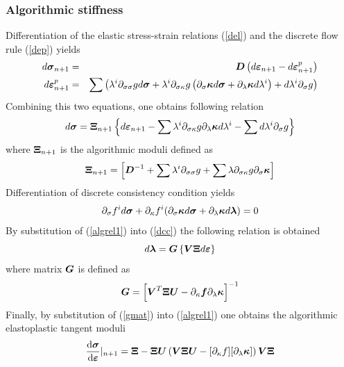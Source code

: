 \documentclass[epsf,a4paper]{article}
\newcommand{\mbf}[1]{\mbox{\boldmath$#1$}}
\newcommand{\del}[2]{\mbox{$\displaystyle\frac{#1}{#2}$}}
\newcommand{\ep}[0]{\mbf{\varepsilon}^p}
\newcommand{\e}{\mbf{\varepsilon}}
\newcommand{\sig}{\mbf{\sigma}}
\newcommand{\kap}{\mbf{\kappa}}
\begin{document}
\subsubsection{Algorithmic stiffness}
Differentiation of the elastic stress-strain relations (\ref{del}) and the discrete flow rule (\ref{dep}) yields
\begin{eqnarray}
  d\sig_{n+1}&=&\mbf{D}\left(d\e_{n+1}-d\ep_{n+1}\right)\\
  d\ep_{n+1}&=&\sum\left(\lambda^i\partial_{\sigma\sigma}gd\sig + \lambda^i\partial_{\sigma\kappa}g\left(\partial_{\sigma}\kap d\sig+\partial_{\lambda}\kap d\lambda^i\right)+d\lambda^i\partial_{\sigma}g\right)
\end{eqnarray}
Combining this two equations, one obtains following relation
\begin{equation}
\label{algrel1}
  d\sig = \mbf{\Xi}_{n+1} \left\{d\e_{n+1}-\sum\lambda^i\partial_{\sigma\kappa}g\partial_{\lambda}\kap d\lambda^i - \sum d\lambda^i\partial_{\sigma}g\right\}
\end{equation}
where $\mbf{\Xi}_{n+1}$ is the algorithmic moduli defined as
\begin{equation}
  \mbf{\Xi}_{n+1}=\left[\mbf{D}^{-1}+\sum\lambda^i\partial_{\sigma\sigma}g+\sum\lambda\partial_{\sigma\kappa}g\partial_{\sigma}\kap\right]
\end{equation}
Differentiation of discrete consistency condition yields
\begin{equation}
  \label{dcc}
  \partial_\sigma f^i d\sig + \partial_\kappa f^i (\partial_\sigma \kap d\sig + \partial_\lambda \kap d\mbf{\lambda}) = 0
\end{equation}
By substitution of (\ref{algrel1}) into (\ref{dcc}) the following relation is obtained
\begin{equation}
  d\mbf{\lambda} = \mbf{G} \left\{\mbf{V}\mbf{\Xi}d\e\right\}
\end{equation}
where matrix $\mbf{G}$ is defined as
\begin{equation}
 \label{gmat}
  \mbf{G}=\left[\mbf{V}^T\mbf{\Xi}\mbf{U}-\partial_{\kappa}\mbf{f}\partial_{\lambda}\mbf{\kappa}\right]^{-1}
\end{equation}
Finally, by substitution of (\ref{gmat}) into (\ref{algrel1}) one obtains the algorithmic elastoplastic tangent moduli
\begin{equation}
  \del{\rm{d}\sig}{\rm{d}\e}\vert_{n+1}=\mbf{\Xi}-\mbf{\Xi}\mbf{U}\left(\mbf{V}\mbf{\Xi}\mbf{U}-[\partial_{\kappa}f][\partial_{\lambda}\kap]\right) \mbf{V}\mbf{\Xi}
\end{equation}
\end{document}
